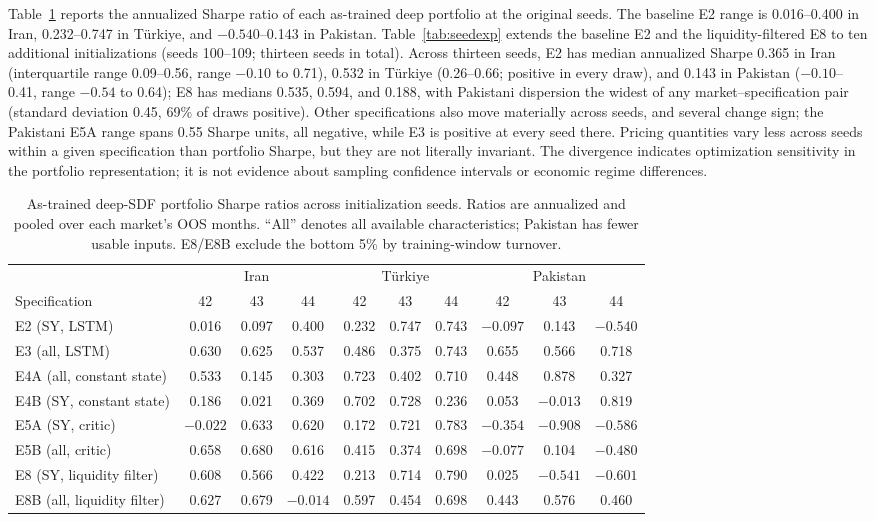 \documentclass[12pt]{article}
\begin{document}
Table~\ref{tab:deep} reports the annualized Sharpe ratio of each as-trained deep portfolio at the original seeds. The baseline E2 range is 0.016--0.400 in Iran, 0.232--0.747 in T\"urkiye, and $-0.540$--0.143 in Pakistan. Table~\ref{tab:seedexp} extends the baseline E2 and the liquidity-filtered E8 to ten additional initializations (seeds 100--109; thirteen seeds in total). Across thirteen seeds, E2 has median annualized Sharpe 0.365 in Iran (interquartile range 0.09--0.56, range $-0.10$ to 0.71), 0.532 in T\"urkiye (0.26--0.66; positive in every draw), and 0.143 in Pakistan ($-0.10$--0.41, range $-0.54$ to 0.64); E8 has medians 0.535, 0.594, and 0.188, with Pakistani dispersion the widest of any market--specification pair (standard deviation 0.45, 69\% of draws positive). Other specifications also move materially across seeds, and several change sign; the Pakistani E5A range spans 0.55 Sharpe units, all negative, while E3 is positive at every seed there. Pricing quantities vary less across seeds within a given specification than portfolio Sharpe, but they are not literally invariant. The divergence indicates optimization sensitivity in the portfolio representation; it is not evidence about sampling confidence intervals or economic regime differences.

\begin{table}[htbp]
\centering
\caption{As-trained deep-SDF portfolio Sharpe ratios across initialization seeds. Ratios are annualized and pooled over each market's OOS months. ``All'' denotes all available characteristics; Pakistan has fewer usable inputs. E8/E8B exclude the bottom 5\% by training-window turnover.}
\label{tab:deep}
\footnotesize
\setlength{\tabcolsep}{3.5pt}
\begin{tabular}{l ccc ccc ccc}
\toprule
 & \multicolumn{3}{c}{Iran} & \multicolumn{3}{c}{T\"urkiye} & \multicolumn{3}{c}{Pakistan} \\
\cmidrule(lr){2-4}\cmidrule(lr){5-7}\cmidrule(lr){8-10}
Specification & 42 & 43 & 44 & 42 & 43 & 44 & 42 & 43 & 44 \\
\midrule
E2 (SY, LSTM) & 0.016 & 0.097 & 0.400 & 0.232 & 0.747 & 0.743 & $-0.097$ & 0.143 & $-0.540$ \\
E3 (all, LSTM) & 0.630 & 0.625 & 0.537 & 0.486 & 0.375 & 0.743 & 0.655 & 0.566 & 0.718 \\
E4A (all, constant state) & 0.533 & 0.145 & 0.303 & 0.723 & 0.402 & 0.710 & 0.448 & 0.878 & 0.327 \\
E4B (SY, constant state) & 0.186 & 0.021 & 0.369 & 0.702 & 0.728 & 0.236 & 0.053 & $-0.013$ & 0.819 \\
E5A (SY, critic) & $-0.022$ & 0.633 & 0.620 & 0.172 & 0.721 & 0.783 & $-0.354$ & $-0.908$ & $-0.586$ \\
E5B (all, critic) & 0.658 & 0.680 & 0.616 & 0.415 & 0.374 & 0.698 & $-0.077$ & 0.104 & $-0.480$ \\
E8 (SY, liquidity filter) & 0.608 & 0.566 & 0.422 & 0.213 & 0.714 & 0.790 & 0.025 & $-0.541$ & $-0.601$ \\
E8B (all, liquidity filter) & 0.627 & 0.679 & $-0.014$ & 0.597 & 0.454 & 0.698 & 0.443 & 0.576 & 0.460 \\
\bottomrule
\end{tabular}
\end{table}
\end{document}
